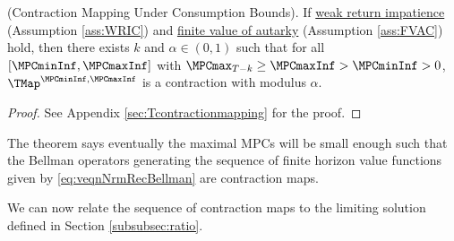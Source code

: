 \documentclass[BufferStockTheory]{subfiles}
\begin{document}
\begin{theorem}(Contraction Mapping Under Consumption Bounds).
\label{thm:cmap}
If \hyperlink{WRIC}{weak return impatience} (Assumption \ref{ass:WRIC})  and  \hyperlink{FVAC}{finite value of autarky} (Assumption \ref{ass:FVAC}) hold, then there exists $k$ and $\alpha\in (0,1)$ such that for all $[\MPCminInf, \MPCmaxInf]$ with $\MPCmax_{T-k}\geq \MPCmaxInf> \MPCminInf>0$, $\TMap^{\MPCminInf, \MPCmaxInf}$ is a contraction with modulus $\alpha$.
\end{theorem}
\begin{proof}
See Appendix \ref{sec:Tcontractionmapping} for the proof. 
\end{proof}

The theorem says eventually the maximal MPCs will be small enough such that the Bellman operators generating the sequence of finite horizon value functions given by \eqref{eq:veqnNrmRecBellman} are contraction maps.

We can now relate the sequence of contraction maps to the limiting solution defined in Section \ref{subsubsec:ratio}.
\end{document}
